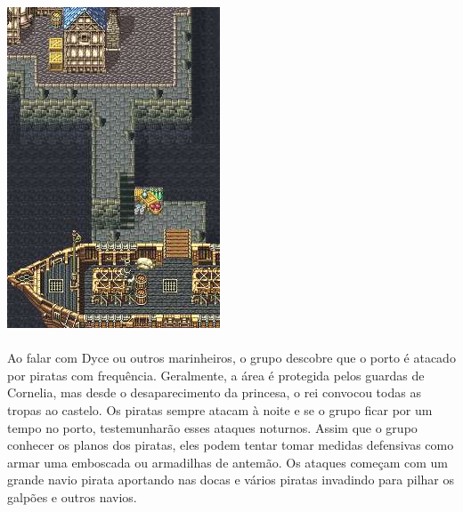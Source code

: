 \includegraphics[width=\columnwidth]{./art/chaosincornelia/port.jpg} \ofpar
%
\\\\
%
Ao falar com Dyce ou outros marinheiros, o grupo descobre que o porto é atacado por piratas com frequência.
Geralmente, a área é protegida pelos guardas de Cornelia, mas desde o desaparecimento da princesa, o rei convocou todas as tropas ao castelo. 
Os piratas sempre atacam à noite e se o grupo ficar por um tempo no porto, testemunharão esses ataques noturnos.
Assim que o grupo conhecer os planos dos piratas, eles podem tentar tomar medidas defensivas como armar uma emboscada ou armadilhas de antemão.
Os ataques começam com um grande navio pirata aportando nas docas e vários piratas invadindo para pilhar os galpões e outros navios.
